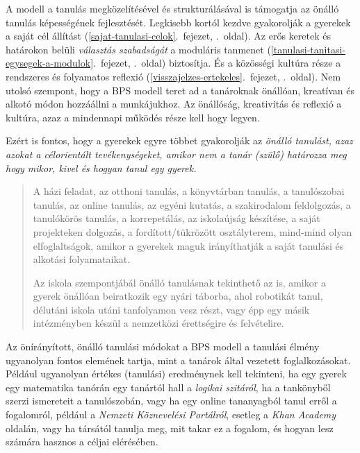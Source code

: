 A modell a tanulás megközelítésével és strukturálásával is támogatja az
önálló tanulás képességének fejlesztését. Legkisebb kortól kezdve
gyakorolják a gyerekek a
saját cél állítást (\ref{sajat-tanulasi-celok}.~fejezet, \pageref{sajat-tanulasi-celok}.~oldal).
Az erős keretek és határokon belüli \emph{választás szabadságát} a
moduláris tanmenet (\ref{tanulasi-tanitasi-egysegek-a-modulok}.~fejezet, \pageref{tanulasi-tanitasi-egysegek-a-modulok}.~oldal)
biztosítja. És a közösségi kultúra része a rendszeres és
folyamatos reflexió (\ref{visszajelzes-ertekeles}.~fejezet, \pageref{visszajelzes-ertekeles}.~oldal).
Nem utolsó szempont, hogy a BPS modell teret ad a tanároknak önállóan,
kreatívan és alkotó módon hozzáállni a munkájukhoz. Az önállóság,
kreativitás és reflexió a kultúra, azaz a mindennapi működés része kell
hogy legyen.

Ezért is fontos, hogy a gyerekek egyre többet gyakorolják az
\emph{önálló tanulást, azaz azokat a célorientált tevékenységeket,
amikor nem a tanár (szülő) határozza meg hogy mikor, kivel és hogyan
tanul egy gyerek.}

\begin{quote}
A házi feladat, az otthoni tanulás, a könyvtárban tanulás, a
tanulószobai tanulás, az online tanulás, az egyéni kutatás, a
szakirodalom feldolgozás, a tanulókörös tanulás, a korrepetálás, az
iskolaújság készítése, a saját projekteken dolgozás, a
fordított/tükrözött osztályterem, mind-mind olyan elfoglaltságok, amikor
a gyerekek maguk irányíthatják a saját tanulási és alkotási
folyamataikat.

Az iskola szempontjábál önálló tanulásnak tekinthető az is, amikor a
gyerek önállóan beiratkozik egy nyári táborba, ahol robotikát tanul,
délutáni iskola utáni tanfolyamon vesz részt, vagy épp egy másik
intézményben készül a nemzetközi érettségire és felvételire.
\end{quote}

Az önírányított, önálló tanulási módokat a BPS modell a tanulási élmény
ugyanolyan fontos elemének tartja, mint a tanárok által vezetett
foglalkozásokat. Például ugyanolyan értékes (tanulási) eredménynek kell
tekinteni, ha egy gyerek egy matematika tanórán egy tanártól hall a
\emph{logikai szitáról}, ha a tankönyből szerzi ismereteit a
tanulószobán, vagy ha egy online tananyagból tanul erről a fogalomról,
például a
{\emph{Nemzeti
Köznevelési Portálról}}, esetleg a
{\emph{Khan
Academy}} oldalán, vagy ha társától tanulja meg, mit takar ez a fogalom,
és hogyan lesz számára hasznos a céljai elérésében.

